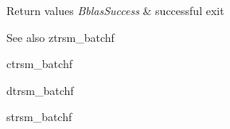 \begin{DoxyRetVals}{Return values}
{\em Bblas\+Success} & successful exit\\
\hline
\end{DoxyRetVals}
\begin{DoxySeeAlso}{See also}
ztrsm\+\_\+batchf 

ctrsm\+\_\+batchf 

dtrsm\+\_\+batchf 

strsm\+\_\+batchf 
\end{DoxySeeAlso}
